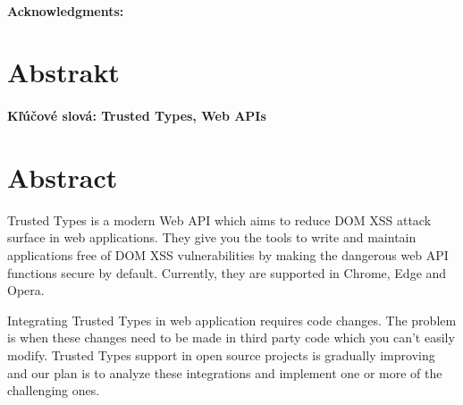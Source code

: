 \documentclass[12pt, twoside]{book}
\begin{document}
\newpage
\thispagestyle{empty}



\frontmatter

\setcounter{page}{3}
\newpage
~

\vfill
{\bf Acknowledgments:}


\newpage
\section*{Abstrakt}


\paragraph*{Kľúčové slová: Trusted Types, Web APIs}


\newpage
\section*{Abstract}

Trusted Types is a modern Web API which aims to reduce DOM XSS attack surface in web applications.
They give you the tools to write and maintain applications free of DOM XSS vulnerabilities by making
the dangerous web API functions secure by default. Currently, they are supported in Chrome, Edge and
Opera.

Integrating Trusted Types in web application requires code changes. The problem is when these
changes need to be made in third party code which you can't easily modify. Trusted Types support in
open source projects is gradually improving and our plan is to analyze these integrations and
implement one or more of the challenging ones.

\end{document}
